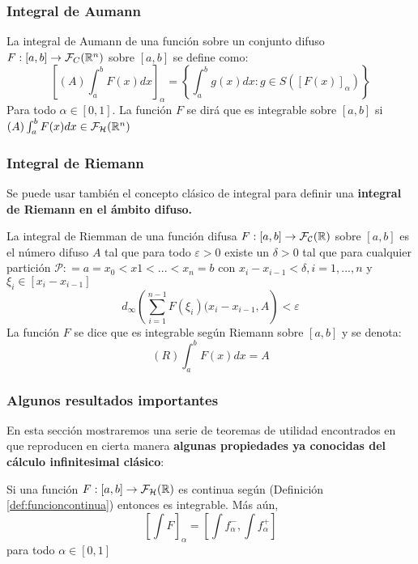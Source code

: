 \subsubsection{Integral de Aumann}
\begin{definicion}
  La integral de Aumann de una función sobre un conjunto difuso $F : [a, b] \rightarrow \mathcal{F}_C(\mathbb R^n)$ sobre $[a, b]$ se define como: 
  \[
  \left[
    (A) \int_{a}^{b} F(x) dx
    \right]_\alpha = \left\{
  \int_{a}^{b} g(x) dx : g \in S([F(x)]_\alpha)
  \right\}
  \]
  Para todo $\alpha \in [0, 1]$. La función $F$ se dirá que es integrable sobre $[a, b]$ si $(A) \int_{a}^{b} F(x) dx \in \mathcal{F}_\mathcal{H}(\mathbb R^n)$
\end{definicion}

\subsubsection{Integral de Riemann}
Se puede usar también el concepto clásico de integral para definir una \textbf{integral de Riemann en el ámbito difuso.}

\begin{definicion}
  La integral de Riemman de una función difusa $F : [a, b] \rightarrow \mathcal{F}_\mathcal{C} (\mathbb R)$ sobre $[a, b]$ es el número difuso $A$ tal que para todo $\varepsilon > 0$ existe un $\delta > 0$ tal que para cualquier partición $\mathcal{P}: = a=x_0 < x1 < ... < x_n = b$ con $x_i - x_{i-1} < \delta, i = 1, ..., n$ y $\xi_i \in [x_i - x_{i-1}]$
  \[
  	d_\infty \left(
  		\sum_{i=1}^{n-1} F(\xi_i)(x_i - x_{i-1}, A
  	\right) < \varepsilon
  \]
  La función $F$ se dice que es integrable según Riemann sobre $[a, b]$ y se denota:
  \[
  	(R) \int_{a}^{b} F(x) dx = A
  \]
\end{definicion}

\subsubsection{Algunos resultados importantes}
En esta sección mostraremos una serie de teoremas de utilidad encontrados en \cite{integral2} que reproducen en cierta manera \textbf{algunas propiedades ya conocidas del cálculo infinitesimal clásico}:

\begin{teorema}
  Si una función $F :  [a, b] \rightarrow \mathcal{F}_\mathcal{H}(\mathbb R)$ es continua según (Definición \ref{def:funcioncontinua}) entonces es integrable. Más aún,
  \[
  \left[
    \int F
    \right]_\alpha = \left[
    \int f_\alpha^-, \int f_\alpha^+
    \right]
  \] para todo $\alpha \in [0, 1]$
\end{teorema}

